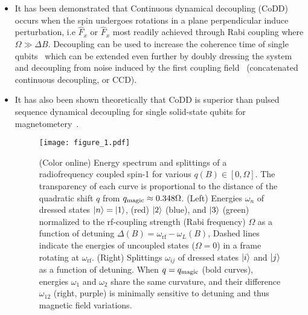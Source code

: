 \documentclass[aps,prl,reprint,superscriptaddress,floatfix]{revtex4-1}
\begin{document}
\begin{itemize}
    \item It has been demonstrated that Continuous dynamical decoupling (CoDD)~\cite{facchi_unification_2004,*fanchini_continuously_2007} occurs when the spin undergoes rotations in a plane perpendicular induce perturbation, i.e $\hat{F}_{x}$ or $\hat{F}_{x}$ most readily achieved through Rabi coupling where $\Omega \gg \Delta B$.
    Decoupling can be used to increase the coherence time of single qubits~\cite{golter_protecting_2014} which can be extended even further by doubly dressing the system and decoupling from noise induced by the first coupling field~\cite{cai_robust_2012} (concatenated continuous decoupling, or CCD).
    \item It has also been shown theoretically that CoDD is superior than pulsed sequence dynamical decoupling for single solid-state qubits for magnetometery~\cite{hirose_continuous_2012}.
\begin{figure}
    \centering
    \texttt{[image: figure\_1.pdf]}
    \caption{
    \label{fig:eigensystem_schematic}
        (Color online)
        Energy spectrum and splittings of a radiofrequency coupled spin-1 for various $q(B)\in[0,\Omega]$.
        The transparency of each curve is proportional to the distance of the quadratic shift $q$ from $q_{\text{magic}}\approx 0.348\Omega$.
        (Left) Energies $\omega_n$ of dressed states $\vert n \rangle =\vert 1 \rangle $, (red) $\vert 2 \rangle $ (blue), and $\vert 3 \rangle $ (green) normalized to the rf-coupling strength (Rabi frequency) $\Omega$ as a function of detuning $\Delta(B)=\omega_{\text{rf}}-\omega_L(B)$,
        Dashed lines indicate the energies of uncoupled states ($\Omega=0$) in a frame rotating at $\omega_{\text{rf}}$.
        (Right) Splittings $\omega_{ij}$ of dressed states $\vert i \rangle $ and $\vert j \rangle $ as a function of detuning.
        When $q=q_{\text{magic}}$ (bold curves), energies $\omega_1$ and $\omega_2$ share the same curvature, and their difference $\omega_{12}$ (right, purple) is minimally sensitive to detuning and thus magnetic field variations. 
    }
\end{figure}


\end{itemize}
\end{document}

